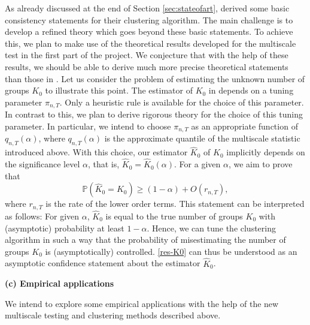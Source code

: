 \documentclass[a4paper,12pt]{article}
\begin{document}
As already discussed at the end of Section \ref{sec:stateofart}, \cite{VogtLinton2018} derived some basic consistency statements for their clustering algorithm. The main challenge is to develop a refined theory which goes beyond these basic statements. To achieve this, we plan to make use of the theoretical results developed for the multiscale test in the first part of the project. We conjecture that with the help of these results, we should be able to derive much more precise theoretical statements than those in \cite{VogtLinton2018}. Let us consider the problem of estimating the unknown number of groups $K_0$ to illustrate this point. The estimator of $K_0$ in \cite{VogtLinton2018} depends on a tuning parameter $\pi_{n,T}$. Only a heuristic rule is available for the choice of this parameter. In contrast to this, we plan to derive rigorous theory for the choice of this tuning parameter. In particular, we intend to choose $\pi_{n,T}$ as an appropriate function of $q_{n,T}(\alpha)$, where $q_{n,T}(\alpha)$ is the approximate quantile of the multiscale statistic introduced above. With this choice, our estimator $\hat{K}_0$ of $K_0$ implicitly depends on the significance level $\alpha$, that is, $\hat{K}_0 = \hat{K}_0(\alpha)$. For a given $\alpha$, we aim to prove that  
\begin{equation}\label{res-K0}
\mathbb{P}( \hat{K}_0 = K_0 ) \ge (1-\alpha) + O(r_{n,T}), 
\end{equation}
where $r_{n,T}$ is the rate of the lower order terms. This statement can be interpreted as follows: For given $\alpha$, $\hat{K}_0$ is equal to the true number of groups $K_0$ with (asymptotic) probability at least $1-\alpha$. Hence, we can tune the clustering algorithm in such a way that the probability of misestimating the number of groups $K_0$ is (asymptotically) controlled. \eqref{res-K0} can thus be understood as an asymptotic confidence statement about the estimator $\hat{K}_0$. 
\vspace{15pt}


\noindent \textbf{(c) Empirical applications} 
\vspace{10pt}


\noindent We intend to explore some empirical applications with the help of the new multiscale testing and clustering methods described above. 
\end{document}
